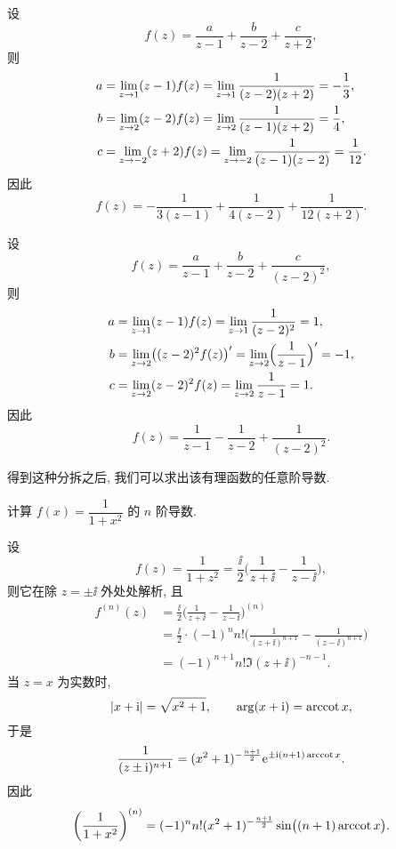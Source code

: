 \begin{solutionenum}
  \item 设
  \[
    f(z)=\frac{a}{z-1}+\frac{b}{z-2}+\frac{c}{z+2},
  \]
  则
  \begin{align*}
    a&=\lim_{z\rightarrow1} (z-1)f(z)
      =\lim_{z\rightarrow1} \frac{1}{(z-2)(z+2)}
      =-\frac13,\\
    b&=\lim_{z\rightarrow2} (z-2)f(z)
      =\lim_{z\rightarrow2} \frac{1}{(z-1)(z+2)}
      =\frac14,\\
    c&=\lim_{z\rightarrow-2} (z+2)f(z)
      =\lim_{z\rightarrow-2} \frac{1}{(z-1)(z-2)}
      =\frac1{12}.
  \end{align*}
  因此
  \[
    f(z)=-\frac{1}{3(z-1)}+\frac{1}{4(z-2)}+\frac{1}{12(z+2)}.
  \]
  \item 设
  \[
    f(z)=\frac{a}{z-1}+\frac{b}{z-2}+\frac{c}{(z-2)^2},
  \]
  则
  \begin{align*}
    a&=\lim_{z\rightarrow1} (z-1)f(z)
      =\lim_{z\rightarrow1} \frac{1}{(z-2)^2}
      =1,\\
    b&=\lim_{z\rightarrow2} \bigl((z-2)^2f(z)\bigr)'
      =\lim_{z\rightarrow2} \Bigl(\frac{1}{z-1}\Bigr)'
      =-1,\\
    c&=\lim_{z\rightarrow2} (z-2)^2f(z)
      =\lim_{z\rightarrow2} \frac{1}{z-1}
      =1.
  \end{align*}
  因此
  \[
    f(z)=\frac{1}{z-1}-\frac{1}{z-2}+\frac{1}{(z-2)^2}.
  \]
\end{solutionenum}

得到这种分拆之后, 我们可以求出该有理函数的任意阶导数.

\begin{example}
  计算 $f(x)=\dfrac1{1+x^2}$ 的 $n$ 阶导数.
\end{example}

\begin{solution}
  设
  \[
     f(z)
    =\dfrac1{1+z^2}
    =\frac \ii2\biggl(\frac1{z+\ii}-\frac1{z-\ii}\biggr),
  \]
  则它在除 $z=\pm \ii$ 外处处解析, 且
  \begin{align*}
     f^{(n)}(z)&
    =\frac \ii2\biggl(\frac1{z+\ii}-\frac1{z-\ii}\biggr)^{(n)}\\&
    =\frac \ii2\cdot(-1)^n n!\biggl(\frac1{(z+\ii)^{n+1}}
      -\frac1{(z-\ii)^{n+1}}\biggr)\\&
    =(-1)^{n+1}n!\Im{(z+\ii)^{-n-1}}.
  \end{align*}
  当 $z=x$ 为实数时,
  \[
    \lvert x+\mathrm{i}\rvert=\sqrt{x^2+1},\qquad
    \arg(x+\mathrm{i})=\operatorname{arccot} x,
  \]
  于是
  \[
    \frac1{(z\pm\mathrm{i})^{n+1}}=(x^2+1)^{-\frac{n+1}2}\mathrm{e}^{\pm\mathrm{i} (n+1)\operatorname{arccot} x}.
  \]
  因此
  \[
     \biggl(\frac1{1+x^2}\biggr)^{(n)}
    =(-1)^nn!(x^2+1)^{-\frac{n+1}2}\sin\bigl((n+1)\operatorname{arccot} x\bigr).
  \]
\end{solution}

